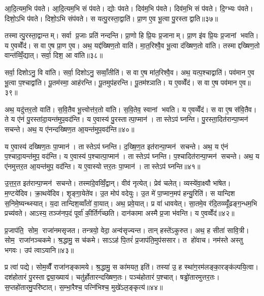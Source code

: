 आ॒दि॒त्यम॒भि प॑वते। आ॒दि॒त्यम॒भि सं प॑वते। द्योः प॑वते। दिव॑म॒भि प॑वते। दिव॑म॒भि सं प॑वते। दि॒ग्भ्यः प॑वते। दिशो॒ऽभि प॑वते। दिशो॒ऽभि संप॑वते। स यत्पु॒रस्ता॒द्वाति॑। प्रा॒ण ए॒व भू॒त्वा पु॒रस्ताद्वाति॥३७॥

तस्मात्पु॒रस्ता॒द्वान्तम्। सर्वा प्र॒जाः प्रति॑ नन्दन्ति। प्रा॒णो हि प्रि॒यः प्र॒जानाम्। प्रा॒ण इ॑व प्रि॒यः प्र॒जानां भवति। य ए॒वव्वेँद॑। स वा ए॒ष प्रा॒ण ए॒व। अथ॒ यद्द॑ख्षिण॒तो वाति॑। मा॒त॒रिश्वै॒व भू॒त्वा द॑ख्षिण॒तो वा॑ति। तस्माद्दख्षिण॒तो वान्त॑व्विँ॒द्यात्। सर्वा॒ दिश॒ आ वा॑ति॥३८॥

सर्वा॒ दिशोऽनु॒ वि वा॑ति। सर्वा॒ दिशोऽनु॒ सव्वाँ॒तीति॑। स वा ए॒ष मा॑त॒रिश्वै॒व। अथ॒ यत्प॒श्चाद्वाति॑। पव॑मान ए॒व भू॒त्वा प॒श्चाद्वा॑ति। पू॒तम॑स्मा॒ आह॑रन्ति। पू॒तमुप॑हरन्ति। पू॒तम॑श्ञाति। य ए॒वव्वेँद॑। स वा ए॒ष पव॑मान ए॒व॥३९॥

अथ॒ यदु॑त्तर॒तो वाति॑। स॒वि॒तैव भू॒त्त्वोत्त॑र॒तो वा॑ति। स॒वि॒तेव॒ स्वानां भवति। य ए॒वव्वेँद॑। स वा ए॒ष स॑वि॒तैव। ते य ए॑नं पु॒रस्ता॑दा॒यन्त॑मुप॒वद॑न्ति। य ए॒वास्य॑ पु॒रस्तात्पा॒प्मान॑। तास्तेऽप॑ घ्नन्ति। पु॒रस्ता॒दित॑रान्पा॒प्मन॑ सचन्ते। अथ॒ य ए॑नन्दख्षिण॒त आ॒यन्त॑मुप॒वद॑न्ति॥४०॥

य ए॒वास्य॑ दख्षिण॒तः पा॒प्मान॑। तास्तेऽप॑ घ्नन्ति। द॒ख्षि॒ण॒त इत॑रान्पा॒प्मन॑ सचन्ते। अथ॒ य ए॑नं प॒श्चादा॒यन्त॑मुप॒ वद॑न्ति। य ए॒वास्य॑ प॒श्चात्पा॒प्मान॑। तास्तेऽप॑ घ्नन्ति। प॒श्चादित॑रान्पा॒प्मन॑ सचन्ते। अथ॒ य ए॑नमुत्तर॒त आ॒यन्त॑मुप॒ वद॑न्ति। य ए॒वास्योत्तर॒तः पा॒प्मान॑। तास्तेऽप॑ घ्नन्ति॥४१॥

उ॒त्त॒र॒त इत॑रान्पा॒प्मन॑ सचन्ते। तस्मा॑दे॒वव्विँ॒द्वान्। वीव॑ नृत्येत्। प्रेव॑ चलेत्। व्यस्ये॑वा॒क्ष्यौ भा॑षेत। म॒ण्टये॑दिव। क्रा॒थये॑दिव। शृ॒ङ्गा॒येते॑व। उ॒त मोप॑ वदेयुः। उ॒त मे॑ पा॒प्मान॒मप॑ हन्यु॒रिति॑। स यान्दिश स॒निमे॒ष्यन्थ्स्यात्। य॒दा तान्दिश॒व्वाँतो॑ वा॒यात्। अथ॒ प्रवे॒यात्। प्र वा॑ धावयेत्। सा॒तमे॒व र॑दि॒तव्व्यूँ॑ढङ्ग॒न्धम॒भि प्रच्य॑वते। आऽस्य॒ तञ्ज॑नप॒दं पूर्वा॑ की॒र्तिर्ग॑च्छति। दान॑कामा अस्मै प्र॒जा भ॑वन्ति। य ए॒वव्वेँद॑॥४२॥\anuvakamend[वेद॒ सं प॑वत आदि॒त्यात्प॑वते वा॒त्या वात्ये॒ष पव॑मान ए॒व द॑ख्षिण॒त आ॒यन्त॑मुप॒ वद॑न्त्युत्तर॒तः पा॒प्मान॒स्ता स्तेप॑ घ्न॒न्तीत्य॒ष्टौ च॑]

प्र॒जाप॑ति॒ सोम॒ राजा॑नमसृजत। तन्त्रयो॒ वेदा॒ अन्व॑सृज्यन्त। तान् हस्ते॑ऽकुरुत। अथ॒ ह सीता॑ सावि॒त्री। सोम॒ राजा॑नञ्चकमे। श्र॒द्धामु॒ स च॑कमे। साऽऽह॑ पि॒तरं॑ प्र॒जाप॑ति॒मुप॑ससार। त हो॑वाच। नम॑स्ते अस्तु भगवः। उप॑ त्वाऽयानि॥४३॥

प्र त्वा॑ पद्ये। सोम॒व्वैँ राजा॑नङ्कामये। श्र॒द्धामु॒ स का॑मयत॒ इति॑। तस्या॑ उ॒ ह स्था॑ग॒रम॑लङ्का॒रङ्क॑ल्पयि॒त्वा। दश॑होतारं पु॒रस्ताद्व्या॒ख्याय॑। चतु॑र्\mbox{}होतारन्दख्षिण॒तः। पञ्च॑होतारं प॒श्चात्। षड्ढो॑तारमुत्तर॒तः। स॒प्तहो॑तारमु॒परि॑ष्टात्। स॒म्भा॒रैश्च॒ पत्नि॑भिश्च॒ मुखे॑ऽल॒ङ्कृत्य॑॥४४॥

